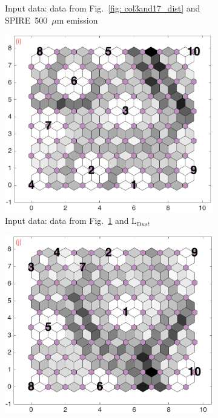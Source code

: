 \begin{figure}
\begin{subfigure}[b]{0.25\textwidth}
        \caption{Input data: data from Fig.~\ref{fig: col3and17_dist} and SPIRE~500~$\mu$m emission }
        \label{fig: col3and18_dist}
    \end{subfigure}
        \hfill
    \begin{subfigure}[b]{0.25\textwidth}
        \centering
        \includegraphics[width=\textwidth]{../../images0.01/M31/2D/diff_dimension/combine_2D_data_between_cols3and19.png}
         \caption{Input data: data from Fig.~\ref{fig: col3and18_dist} and L$_{{\mathrm Dust}}$}
        \label{fig: col3and19_dist}
    \end{subfigure}
        \hfill
    \begin{subfigure}[b]{0.25\textwidth}
        \centering
        \includegraphics[width=\textwidth]{../../images0.01/M31/2D/diff_dimension/combine_2D_data_between_cols3and20.png}

\end{subfigure}
\end{figure}
